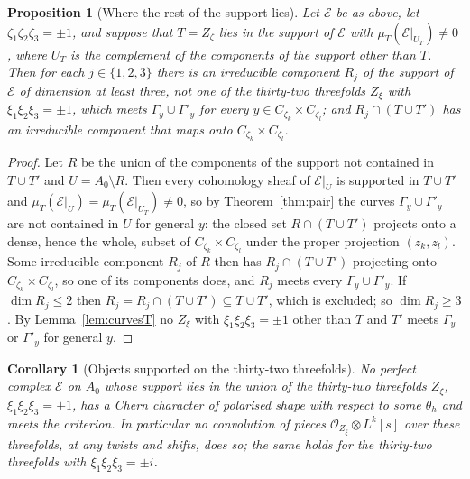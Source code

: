 \documentclass[11pt,reqno]{amsart}
\numberwithin{equation}{section}
\theoremstyle{plain}
\newtheorem{proposition}[theorem]{Proposition}
\newtheorem{corollary}[theorem]{Corollary}
\theoremstyle{definition}
\begin{document}
\begin{proposition}[Where the rest of the support lies]\label{prop:rest}
Let $\mathcal{E}$ be as above, let $\zeta_{1}\zeta_{2}\zeta_{3}=\pm1$, and suppose that $T=Z_{\zeta}$ lies in the support of $\mathcal{E}$ with $\mu_{T}(\mathcal{E}|_{U_{T}})\ne0$, where $U_{T}$ is the complement of the components of the support other than $T$. Then for each $j\in\{1,2,3\}$ there is an irreducible component $R_{j}$ of the support of $\mathcal{E}$ of dimension at least three, not one of the thirty-two threefolds $Z_{\xi}$ with $\xi_{1}\xi_{2}\xi_{3}=\pm1$, which meets $\Gamma_{y}\cup\Gamma'_{y}$ for every $y\in C_{\zeta_{k}}\times C_{\zeta_{l}}$; and $R_{j}\cap(T\cup T')$ has an irreducible component that maps onto $C_{\zeta_{k}}\times C_{\zeta_{l}}$.
\end{proposition}

\begin{proof}
Let $R$ be the union of the components of the support not contained in $T\cup T'$ and $U=A_{0}\setminus R$. Then every cohomology sheaf of $\mathcal{E}|_{U}$ is supported in $T\cup T'$ and $\mu_{T}(\mathcal{E}|_{U})=\mu_{T}(\mathcal{E}|_{U_{T}})\ne0$, so by Theorem~\ref{thm:pair} the curves $\Gamma_{y}\cup\Gamma'_{y}$ are not contained in $U$ for general $y$: the closed set $R\cap(T\cup T')$ projects onto a dense, hence the whole, subset of $C_{\zeta_{k}}\times C_{\zeta_{l}}$ under the proper projection $(z_{k},z_{l})$. Some irreducible component $R_{j}$ of $R$ then has $R_{j}\cap(T\cup T')$ projecting onto $C_{\zeta_{k}}\times C_{\zeta_{l}}$, so one of its components does, and $R_{j}$ meets every $\Gamma_{y}\cup\Gamma'_{y}$. If $\dim R_{j}\le2$ then $R_{j}=R_{j}\cap(T\cup T')\subseteq T\cup T'$, which is excluded; so $\dim R_{j}\ge3$. By Lemma~\ref{lem:curvesT} no $Z_{\xi}$ with $\xi_{1}\xi_{2}\xi_{3}=\pm1$ other than $T$ and $T'$ meets $\Gamma_{y}$ or $\Gamma'_{y}$ for general $y$.
\end{proof}

\begin{corollary}[Objects supported on the thirty-two threefolds]\label{cor:threefolds}
No perfect complex $\mathcal{E}$ on $A_{0}$ whose support lies in the union of the thirty-two threefolds $Z_{\xi}$, $\xi_{1}\xi_{2}\xi_{3}=\pm1$, has a Chern character of polarised shape with respect to some $\theta_{h}$ and meets the criterion. In particular no convolution of pieces $\mathcal{O}_{Z_{\xi}}\otimes L^{k}[s]$ over these threefolds, at any twists and shifts, does so; the same holds for the thirty-two threefolds with $\xi_{1}\xi_{2}\xi_{3}=\pm i$.
\end{corollary}
\end{document}
